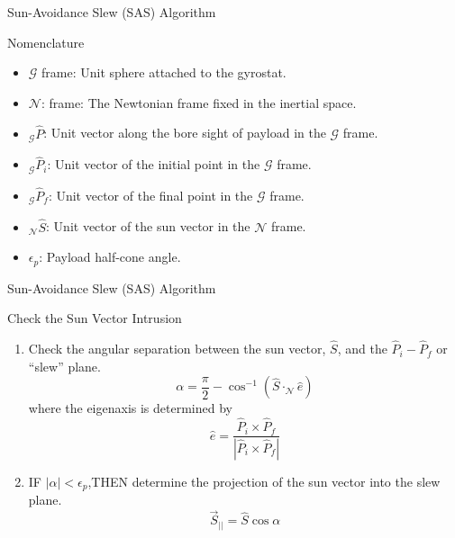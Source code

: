 \documentclass{beamer}
\begin{document}
\begin{frame}{Sun-Avoidance Slew (SAS) Algorithm}
\begin{block}{Nomenclature}
\begin{itemize}
\item $\mathcal{G}$ frame: Unit sphere attached to the gyrostat.
\item $\mathcal{N}$: frame: The Newtonian frame fixed in the inertial space.
\item $_\mathcal{G}\hat{P}$: Unit vector along the bore sight of payload in the $\mathcal{G}$ frame.
\item $_\mathcal{G}\hat{P}_i$: Unit vector of the initial point in the $\mathcal{G}$ frame.
\item $_\mathcal{G}\hat{P}_f$: Unit vector of the final point in the $\mathcal{G}$ frame.
\item $_\mathcal{N}\hat{S}$: Unit vector of the sun vector in the $\mathcal{N}$ frame.
 \item $\epsilon_p$: Payload half-cone angle.
\end{itemize}
\end{block}
\end{frame}
%
\begin{frame}{Sun-Avoidance Slew (SAS) Algorithm}
\begin{block}{Check the Sun Vector Intrusion}
\begin{enumerate}
\item Check the angular separation between the sun vector, $\hat{S}$, and the $\hat{P}_i-\hat{P}_f$ or ``slew'' plane.
\begin{equation}
\alpha=\frac{\pi}{2}-\cos^{-1}(\hat{S}\cdot_\mathcal{N}\hat{e})
\end{equation}
where the eigenaxis is determined by
\begin{equation}\label{eaxis}
\hat{e}=\frac{\hat{P}_i\times\hat{P}_f}{|\hat{P}_i\times \hat{P}_f|}
\end{equation} 

\item IF $|\alpha|<\epsilon_p$,THEN determine the projection of the sun vector into the slew plane.
\begin{equation}\label{Sbar}
\vec{S}_{||}=\hat{S}\cos\alpha
\end{equation}

\end{enumerate}
\end{block}
\end{frame}
\end{document}
